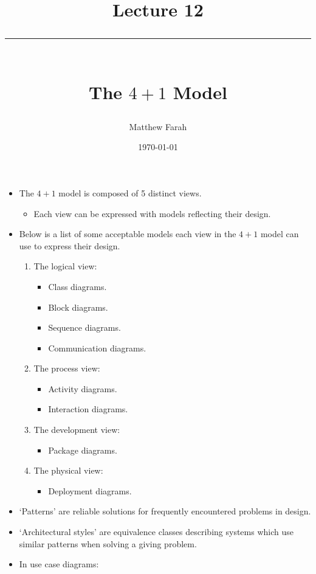 \documentclass{article}
\date{
	\vspace{-.75em}
	{\large \today}
}
\title{
	\vspace*{-1.5em}
	{\Huge Lecture 12} \\
	\vspace{-1em}
	\rule{\textwidth/4}{.01em} \\
	\vspace{-.25em}
	{\Large The $4 + 1$ Model}
	\vspace{-.75em}
}
\author{
	{\large Matthew Farah}
}
\begin{document}
\maketitle
\pagestyle{fancy}

\fi

\begin{itemize}
	\item The $4 + 1$ model is composed of 5 distinct views.
	\begin{itemize}
		\item Each view can be expressed with models reflecting their design.
	\end{itemize}
	\item Below is a list of some acceptable models each view in the $4 + 1$ model can use to express their design.
	\begin{enumerate}
		\item The logical view:
		\begin{itemize}
			\item Class diagrams.
			\item Block diagrams.
			\item Sequence diagrams.
			\item Communication diagrams.
		\end{itemize}
		\item The process view:
		\begin{itemize}
			\item Activity diagrams.
			\item Interaction diagrams.
		\end{itemize}
		\item The development view:
		\begin{itemize}
			\item Package diagrams.
		\end{itemize}
		\item The physical view:
		\begin{itemize}
			\item Deployment diagrams.
		\end{itemize}
	\end{enumerate}
	\item `Patterns' are reliable solutions for frequently encountered problems in design.
	\item `Architectural styles' are equivalence classes describing systems which use similar patterns when solving a giving problem.
	\item In use case diagrams:
	\begin{itemize}

\end{itemize}
\end{itemize}
\end{document}
